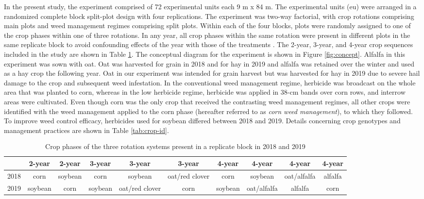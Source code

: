 \documentclass[utf8]{frontiersSCNS}
\begin{document}
In the present study, the experiment comprised of 72 experimental units each 9 m x 84 m. The experimental units (eu) were arranged in a randomized complete block split-plot design with four replications. The experiment was two-way factorial, with crop rotations comprising main plots and weed management regimes comprising split plots. Within each of the four blocks, plots were randomly assigned to one of the crop phases within one of three rotations. In any year, all crop phases within the same rotation were present in different plots in the same replicate block to avoid confounding effects of the year with those of the treatments \citep{payneDesignAnalysisLong2015}. The 2-year, 3-year, and 4-year crop sequences included in the study are shown in Table \ref{tab:sequence}. The conceptual diagram for the experiment is shown in Figure \ref{fig:concept}. Alfalfa in this experiment was sown with oat. Oat was harvested for grain in 2018 and for hay in 2019 and alfalfa was retained over the winter and used as a hay crop the following year. Oat in our experiment was intended for grain harvest but was harvested for hay in 2019 due to severe hail damage to the crop and subsequent weed infestation. In the conventional weed management regime, herbicide was broadcast on the whole area that was planted to corn, whereas in the low herbicide regime, herbicide was applied in 38-cm bands over corn rows, and interrow areas were cultivated. Even though corn was the only crop that received the contrasting weed management regimes, all other crops were identified with the weed management applied to the corn phase (hereafter referred to as \emph{corn weed management}), to which they followed. To improve weed control efficacy, herbicides used for soybean differed between 2018 and 2019. Details concerning crop genotypes and management practices are shown in Table \ref{tab:crop-id}.

\begin{table}[htbp]

\caption{\label{tab:sequence}Crop phases of the three rotation systems present in a replicate block in 2018 and 2019}
\centering
\fontsize{8}{10}\selectfont
\begin{tabular}[t]{l|c|c|c|c|c|c|c|c|c}
\hline
 & 2-year & 2-year & 3-year & 3-year & 3-year & 4-year & 4-year & 4-year & 4-year\\
\hline
2018 & corn & soybean & corn & soybean & oat/red clover & corn & soybean & oat/alfalfa & alfalfa\\
2019 & soybean & corn & soybean & oat/red clover & corn & soybean & oat/alfalfa & alfalfa & corn\\
\hline
\end{tabular}
\end{table}
\end{document}
